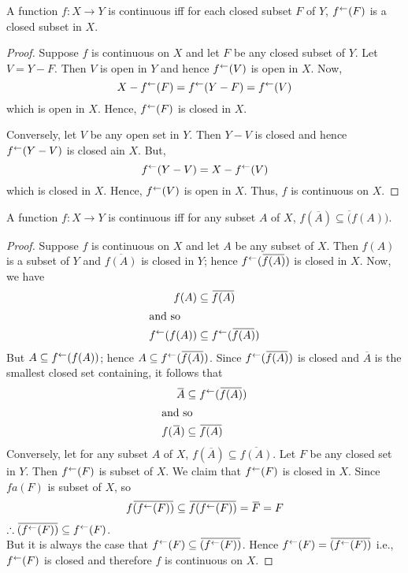 \documentclass[../main-sheet.tex]{subfiles}
\begin{document}
\begin{thm}
    A function \(f:X\to Y\) is continuous iff for each closed subset \(F\) of \(Y\), \(f^{\leftarrow}(F)\) is a closed subset in \(X\).
\end{thm}
\begin{proof}
    Suppose \(f\) is continuous on \(X\) and let \(F\) be any closed subset of \(Y\). Let \(V=Y-F\). Then \(V\) is open in \(Y\) and hence \(f^{\leftarrow}(V)\) is open in \(X\). Now,
    \[X-f^{\leftarrow}(F)=f^{\leftarrow}(Y-F)=f^{\leftarrow}(V)\]
    which is open in \(X\). Hence, \(f^{\leftarrow}(F)\) is closed in \(X\).

    Conversely, let \(V\) be any open set in \(Y\). Then \(Y-V\) is closed and hence \(f^{\leftarrow}(Y-V)\) is closed ain \(X\). But,
    \[f^{\leftarrow}(Y-V)=X-f^{\leftarrow}(V)\]
    which is closed in \(X\). Hence, \(f^{\leftarrow}(V)\) is open in \(X\). Thus, \(f\) is continuous on \(X\).
\end{proof}
\begin{thm}
    A function \(f:X\to Y\) is continuous iff for any subset \(A \) of \(X\), \(f(\overbar{A})\subseteq\overbar(f(A))\).
\end{thm}
\begin{proof}
    Suppose \(f\) is continuous on \(X\) and let \(A\) be any subset of \(X\). Then \(f(A)\) is a subset of \(Y\) and \(\overbar{f(A)}\) is closed in \(Y\); hence \(\fa(\overbar{f(A)})\) is closed in \(X\). Now, we have
    \begin{align*}
        f(A)&\subseteq \overbar{f(A)}\\
        \intertext{and so}
        \fa(f(A))&\subseteq \fa(\overbar{f(A)})
    \end{align*}
    But \(A\subseteq f^{\leftarrow}(f(A))\); hence \(A\subseteq \fa(\overbar{f(A)})\). Since \(\fa(\overbar{f(A)})\) is closed and \(\overbar{A}\) is the smallest closed set containing, it follows that
    \begin{align*}
        \overbar{A}&\subseteq \fa(\overbar{f(A)})\\
        \intertext{and so}
        f(\overbar{A})&\subseteq \overbar{f(A)}
    \end{align*}
    Conversely, let for any subset \(A\) of \(X\), \(f(\overbar{A})\subseteq\overbar{f(A)}\). Let \(F\) be any closed set in \(Y\). Then \(f^{\leftarrow}(F)\) is subset of \(X\). We claim that \(f^{\leftarrow}(F)\) is closed in \(X\). Since \(fa(F)\) is subset of \(X\), so
    \[f\overbar{(\fa(F))}\subseteq\overbar{f(\fa(F))}=\overbar{F}=F\]
    \(\therefore \overbar{(\fa(F))}\subseteq \fa(F)\).\\
    But it is always the case that \(\fa(F)\subseteq\overbar{(\fa(F))}\). Hence \(\fa(F)=\overbar{(\fa(F))}\) i.e., \(f^{\leftarrow}(F)\) is closed and therefore \(f\) is continuous on \(X\).
\end{proof}
\end{document}
